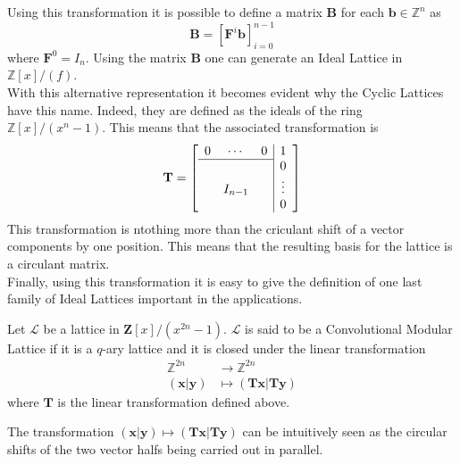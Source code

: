 Using this transformation it is possible to define a matrix $\mathbf{B}$ for each $\mathbf{b}\in\mathbb{Z}^n$ as
\begin{equation*}
\mathbf{B}=\left[\mathbf{F}^{i}\mathbf{b}\right]_{i=0}^{n-1}
\end{equation*}
where $\mathbf{F}^0=I_n$. Using the matrix $\mathbf{B}$ one can generate an Ideal Lattice in $\mathbb{Z}[x]/(f)$.\\
With this alternative representation it becomes evident why the Cyclic Lattices have this name. Indeed, they are defined as the ideals of the ring $\mathbb{Z}[x]/(x^n-1)$. This means that the associated transformation is
\begin{equation*}
\mathbf{T}=
\left[\begin{array}{ccc|c}
0&\cdots&0&1\\
\cline{1-3}
&&&0\\
&I_{n-1}&&\vdots\\
&&&0
\end{array}\right]
\end{equation*}
This transformation is ntothing more than the criculant shift of a vector components by one position. This means that the resulting basis for the lattice is a circulant matrix.\\
Finally, using this transformation it is easy to give the definition of one last family of Ideal Lattices important in the applications.
\begin{definition}
Let $\mathscr{L}$ be a lattice in $\mathbf{Z}[x]/(x^{2n}-1)$. $\mathscr{L}$ is said to be a Convolutional Modular Lattice if it is a $q$-ary lattice and it is closed under the linear transformation
\begin{align*}
\mathbb{Z}^{2n}&\rightarrow \mathbb{Z}^{2n} \\
(\mathbf{x}|\mathbf{y}) &\mapsto (\mathbf{Tx}|\mathbf{Ty})
\end{align*}
where $\mathbf{T}$ is the linear transformation defined above.
\end{definition}
\begin{remark}
The transformation $(\mathbf{x}|\mathbf{y}) \mapsto (\mathbf{Tx}|\mathbf{Ty})$ can be intuitively seen as the circular shifts of the two vector halfs being carried out in parallel.
\end{remark}

